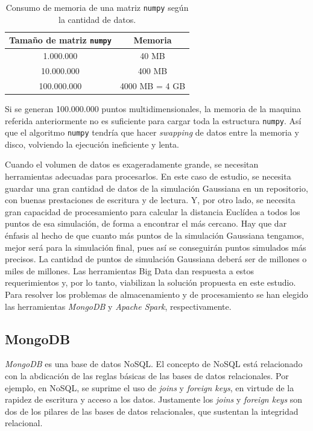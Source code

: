 \documentclass[11pt,spanish,listoffigures,listoftables]{tfgetsinf}
\begin{document}
        \begin{table}[H]
             \centering
             \begin{tabular}{|c|c|} 
                 \hline
                 Tamaño de matriz {\tt numpy} & Memoria \\ [0.5ex] 
                 \hline\hline
                 1.000.000 & 40 MB \\ 
                 \hline
                 10.000.000 & 400 MB \\ 
                 \hline
                 100.000.000 & 4000 MB = 4 GB \\ 
                 \hline
            \end{tabular}
            \caption{Consumo de memoria de una matriz {\tt numpy} según la cantidad de datos.}
            \label{table:memory}
        \end{table}
        
        Si se generan 100.000.000 puntos multidimensionales, la memoria de la maquina referida anteriormente no es suficiente para cargar toda la estructura {\tt numpy}. Así que el algoritmo {\tt numpy} tendría que hacer {\em swapping} de datos entre la memoria y disco, volviendo la ejecución ineficiente y lenta. 
        
        Cuando el volumen de datos es exageradamente grande, se necesitan herramientas adecuadas para procesarlos. En este caso de estudio, se necesita guardar una gran cantidad de datos de la simulación Gaussiana en un repositorio, con buenas prestaciones de escritura y de lectura. Y, por otro lado, se necesita gran capacidad de procesamiento para calcular la distancia Euclídea a todos los puntos de esa simulación, de forma a encontrar el más cercano. Hay que dar énfasis al hecho de que cuanto más puntos de la simulación Gaussiana tengamos, mejor será para la simulación final, pues así se conseguirán puntos simulados más precisos. La cantidad de puntos de simulación Gaussiana deberá ser de millones o miles de millones. Las herramientas Big Data dan respuesta a estos requerimientos y, por lo tanto, viabilizan la solución propuesta en este estudio. Para resolver los problemas de almacenamiento y de procesamiento se han elegido las herramientas {\em MongoDB} y {\em Apache Spark}, respectivamente.
        
        \subsection{MongoDB}
        {\em MongoDB} es una base de datos NoSQL. El concepto de NoSQL está relacionado con la abdicación de las reglas básicas de las bases de datos relacionales. Por ejemplo, en NoSQL, se suprime el uso de {\em joins} y {\em foreign keys}, en virtude de la rapidez de escritura y acceso a los datos. Justamente los {\em joins} y {\em foreign keys} son dos de los pilares de las bases de datos relacionales, que sustentan la integridad relacional. 
        
\end{document}
